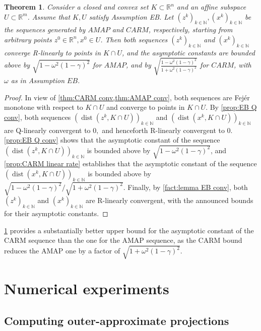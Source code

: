\documentclass[smallextended,numbook,nospthms]{svjour3}
\theoremstyle{plain}
\newtheorem{theorem}{Theorem}[subsection]
\theoremstyle{definition}
\def\RR{\mathds R}
\def\NN{\mathds N}
\DeclareMathOperator{\dist}{dist}
\begin{document}
\begin{theorem}\label{thm:CARM EB conv}
	Consider a closed and convex set $K \subset \RR^{n}$ and an affine subspace $U \subset \RR^{m}$. Assume that $K, U$ satisfy Assumption EB. Let $\left(z^{k}\right)_{k \in \NN},\left(x^{k}\right)_{k \in \NN}$ be the sequences generated by $AMAP$ and $CARM$, respectively, starting from arbitrary points $z^{0} \in \RR^{n}, x^{0} \in U$. Then both sequences $\left(z^{k}\right)_{k \in \NN}$ and $\left(x^{k}\right)_{k \in \NN}$
	converge R-linearly to points in $K \cap U$, and the asymptotic constants are bounded above by $\sqrt{1-\omega^{2}(1-\gamma)^{2}}$ for $AMAP$, and by $\sqrt{\frac{1-\omega^{2}(1-\gamma)^{2}}{1+\omega^{2}(1-\gamma)^{2}}}$ for $CARM$, with $\omega$ as in Assumption $EB$.
\end{theorem}
\begin{proof}
	In view of \cref{thm:CARM conv,thm:AMAP conv}, both sequences are Fejér monotone with respect to $K \cap U$ and converge to points in $K \cap U$. By \cref{prop:EB Q conv}, both sequences $\left(\dist\left(z^{k}, K \cap U\right)\right)_{k \in \NN}$ and $\left(\dist\left(x^{k}, K \cap U\right)\right)_{k \in \NN}$ are Q-linearly convergent to $0,$ and henceforth R-linearly convergent to 0. 
	\cref{prop:EB Q conv} shows that the asymptotic constant of the sequence $\left(\dist\left(z^{k}, K \cap U\right)\right)_{k \in \NN}$ is bounded above by $\sqrt{1-\omega^{2}(1-\gamma)^{2}}$, and \cref{prop:CARM linear rate} establishes that the asymptotic constant of the sequence $\left(\dist\left(x^{k}, K \cap U\right)\right)_{k \in \NN}$ is bounded above by $\sqrt{1-\omega^{2}(1-\gamma)^{2}} / \sqrt{1+\omega^{2}(1-\gamma)^{2}}$. Finally, by \cref{fact:lemma EB conv}, both $\left(z^{k}\right)_{k \in \NN}$ and $\left(x^{k}\right)_{k \in \NN}$ are R-linearly convergent, with the announced bounds for their asymptotic constants.
\end{proof}

\cref{thm:CARM EB conv} provides a substantially better upper bound for the asymptotic constant of the CARM sequence than the one for the AMAP sequence, as the CARM bound reduces the AMAP one by a factor of $\sqrt{1+\omega^{2}(1-\gamma)^2}$.

\newpage
\section{Numerical experiments}\label{sec:numerical}
\subsection{Computing outer-approximate projections}
\end{document}
